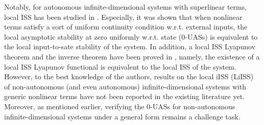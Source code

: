 \documentclass[onecolumn]{autart}
\newenvironment{proof of Prop.ODE}{{\it Proof of Proposition~\ref{Prop.ODE}:\enspace}}{\hfill $\blacksquare$\par}
\newenvironment{proof of PDE}{{\it Proof of Proposition \ref{Prop.8}:\enspace}}{\hfill $\blacksquare$\par}
\begin{document}






Notably, for autonomous infinite-dimensional {systems} with superlinear terms, local ISS   has been studied in %
\cite{mironchenko2016local}.   Especially, it was shown  that when   nonlinear terms satisfy a sort of uniform continuity condition  w.r.t. external inputs, {the local asymptotic
	stability at zero uniformly w.r.t. state (0-UASs) is equivalent to the local input-to-sate stability of the system. In addition, a}  local ISS Lyapunov theorem and the  inverse theorem have been proved in \cite{mironchenko2016local}, namely, the existence of a local ISS Lyapunov functional  is equivalent to the local ISS of the system.
However, to the best  knowledge of the authors, results on the local iISS (LiISS) of non-autonomous (and even autonomous) infinite-dimensional systems with generic nonlinear terms have not been reported in the existing literature yet. {Moreover, as mentioned earlier, verifying the 0-UASs for non-autonomous
	infinite-dimensional systems under a general form remains a challenge task.}
\end{document}
